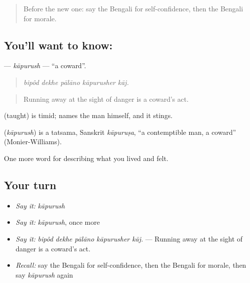 \label{lesson:BN-C453-kapurush}



\begin{quote}
Before the new one: say the Bengali for self-confidence, then the Bengali for morale.
\end{quote}

\subsection*{You'll want to know: }
\textbf{} — \emph{kāpurush} — \textquotedblleft{}a coward\textquotedblright{}.

\begin{quote}
    
\end{quote}

\begin{quote}
\emph{bipôd dekhe pālāno kāpurusher kāj.}
\end{quote}

\begin{quote}
Running away at the sight of danger is a coward's act.
\end{quote}

 (taught) is timid;  names the man himself, and it stings.

\begin{cousinweb}
\textbf{} (\emph{kāpurush}) is a tatsama, Sanskrit \emph{kāpuruṣa}, \textquotedblleft{}a contemptible man, a coward\textquotedblright{} (Monier-Williams).
\end{cousinweb}

\begin{grammarlens}[title={What you've built}]
One more word for describing what you lived and felt.
\end{grammarlens}

\subsection*{Your turn}
\begin{itemize}
\raggedright
  \item \emph{Say it:} \emph{kāpurush}
  \item \emph{Say it:} \emph{kāpurush}, once more
  \item \emph{Say it:} \emph{bipôd dekhe pālāno kāpurusher kāj.} — Running away at the sight of danger is a coward's act.
  \item \emph{Recall:} say the Bengali for self-confidence, then the Bengali for morale, then say \emph{kāpurush} again
\end{itemize}


